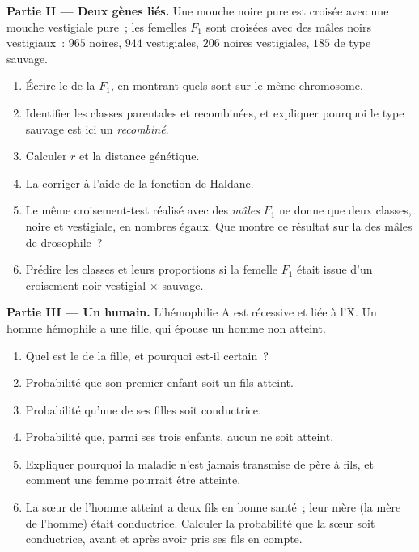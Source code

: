 \begin{problem}
\medskip
\noindent\textbf{Partie II --- Deux gènes liés.}
Une mouche noire pure est croisée avec une mouche vestigiale pure~; les
femelles $F_1$ sont croisées avec des mâles noirs vestigiaux~: $965$
noires,
$944$ vestigiales, $206$ noires vestigiales, $185$ de type sauvage.
\begin{enumerate}[resume]
  \item Écrire le  de la $F_1$, en montrant quels  sont
        sur le même chromosome.
  \item Identifier les classes parentales et recombinées, et expliquer
        pourquoi le type sauvage est ici un \emph{recombiné}.
  \item Calculer $r$ et la distance génétique.
  \item La corriger à l'aide de la fonction de Haldane.
  \item Le même croisement-test réalisé avec des \emph{mâles} $F_1$ ne
        donne que deux classes, noire et vestigiale, en nombres égaux.
        Que montre ce résultat sur la  des mâles de drosophile~?
  \item Prédire les classes et leurs proportions si la femelle $F_1$
        était issue d'un croisement noir vestigial $\times$ sauvage.
\end{enumerate}

\medskip
\noindent\textbf{Partie III --- Un  humain.}
L'hémophilie A est récessive et liée à l'X. Un homme hémophile a une
fille, qui épouse un homme non atteint.
\begin{enumerate}[resume]
  \item Quel est le  de la fille, et pourquoi est-il certain~?
  \item Probabilité que son premier enfant soit un fils atteint.
  \item Probabilité qu'une de ses filles soit conductrice.
  \item Probabilité que, parmi ses trois enfants, aucun ne soit
        atteint.
  \item Expliquer pourquoi la maladie n'est jamais transmise de père à
        fils, et comment une femme pourrait être atteinte.
  \item La sœur de l'homme atteint a deux fils en bonne santé~; leur
        mère (la mère de l'homme) était conductrice. Calculer la
        probabilité que la sœur soit conductrice, avant et après avoir
        pris ses fils en compte.
\end{enumerate}


\end{problem}
